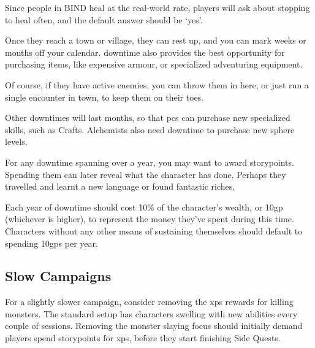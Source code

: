 \begin{multicols}{2}
Since people in BIND heal at the real-world rate, players will ask about stopping to heal often, and the default answer should be `yes'.

Once they reach a town or village, they can rest up, and you can mark weeks or months off your calendar.
\Gls{downtime} also provides the best opportunity for purchasing items, like expensive armour, or specialized adventuring equipment.


Of course, if they have active enemies, you can throw them in here, or just run a single encounter in town, to keep them on their toes.

Other \glspl{downtime} will last months, so that \glspl{pc} can purchase new specialized skills, such as Crafts.
Alchemists also need \gls{downtime} to purchase new sphere levels.

For any \gls{downtime} spanning over a year, you may want to award \glspl{storypoint}.
Spending them can later reveal what the character has done.
Perhaps they travelled and learnt a new language or found fantastic riches.


Each year of downtime should cost 10\% of the character's wealth, or 10\gls{gp} (whichever is higher), to represent the money they've spent during this time.
Characters without any other means of sustaining themselves should default to spending 10\glspl{gp} per year.

\subsection{Slow Campaigns}

For a slightly slower campaign, consider removing the \glspl{xp} rewards for killing monsters.
The standard setup has characters swelling with new abilities every couple of sessions.
Removing the monster slaying focus should initially demand players spend \glspl{storypoint} for \glspl{xp}, before they start finishing Side Quests.

\end{multicols}

